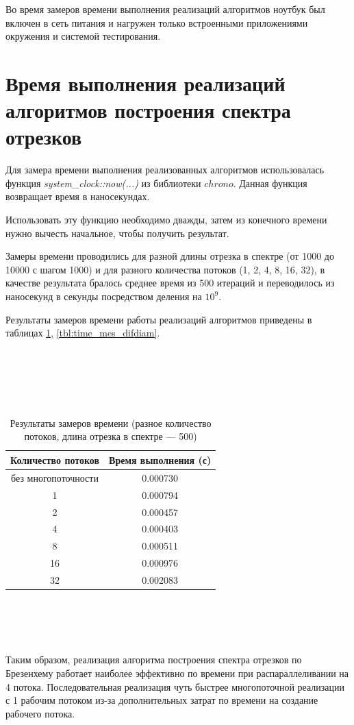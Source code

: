 Во время замеров времени выполнения реализаций алгоритмов ноутбук был включен в сеть питания и нагружен только встроенными приложениями окружения и системой тестирования.

\section{Время выполнения реализаций алгоритмов построения спектра отрезков}
Для замера времени выполнения реализованных алгоритмов использовалась функция \textit{system\_clock::now(...)} из библиотеки $chrono$. Данная функция возвращает время в наносекундах.

Использовать эту функцию необходимо дважды, затем из конечного времени нужно вычесть начальное, чтобы получить результат.

Замеры времени проводились для разной длины отрезка в спектре (от 1000 до 10000 с шагом 1000) и для разного количества потоков (1, 2, 4, 8, 16, 32), в качестве результата бралось среднее время из 500 итераций и переводилось из наносекунд в секунды посредством деления на $10^9$.

Результаты замеров времени работы реализаций алгоритмов приведены в таблицах \ref{tbl:time_mes_par}, \ref{tbl:time_mes_difdiam}.
\\
\\
\\
\\
\\
\\
\begin{table}[h]
    \begin{center}
        \caption{Результаты замеров времени (разное количество потоков, длина отрезка в спектре --- 500)}
        \label{tbl:time_mes_par}
        \begin{tabular}{|c|c|}
            \hline
            Количество потоков & Время выполнения (с) \\
            \hline
            без многопоточности & 0.000730 \\ \hline
            1 & 0.000794 \\ \hline 
            2 & 0.000457 \\ \hline 
            4 & 0.000403 \\ \hline 
            8 & 0.000511 \\ \hline 
            16 & 0.000976 \\ \hline 
            32 & 0.002083 \\ \hline 
		\end{tabular}
\end{center}
\end{table}
\\
\\
\\
\\
\FloatBarrier
Таким образом, реализация алгоритма построения спектра отрезков по Брезенхему работает наиболее эффективно по времени при распараллеливании на 4 потока.
Последовательная реализация чуть быстрее многопоточной реализации с 1 рабочим потоком из-за дополнительных затрат по времени на создание рабочего потока.

